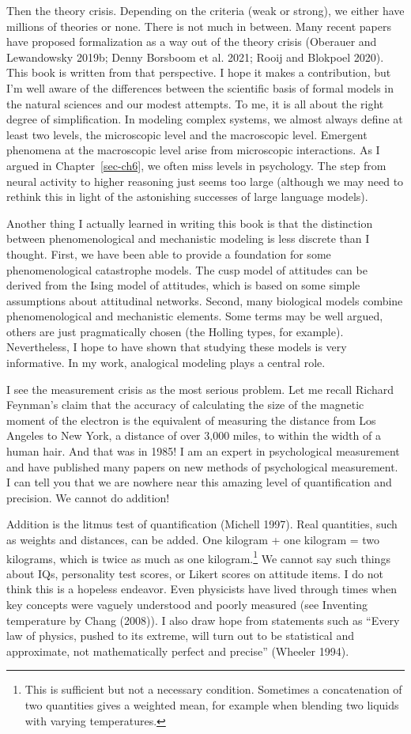 \documentclass[
  a4paper,
  DIV=11,
  numbers=noendperiod]{scrreprt}
\begin{document}
Then the theory crisis. Depending on the criteria (weak or strong), we
either have millions of theories or none. There is not much in between.
Many recent papers have proposed formalization as a way out of the
theory crisis (Oberauer and Lewandowsky 2019b; Denny Borsboom et al.
2021; Rooij and Blokpoel 2020). This book is written from that
perspective. I hope it makes a contribution, but I'm well aware of the
differences between the scientific basis of formal models in the natural
sciences and our modest attempts. To me, it is all about the right
degree of simplification. In modeling complex systems, we almost always
define at least two levels, the microscopic level and the macroscopic
level. Emergent phenomena at the macroscopic level arise from
microscopic interactions. As I argued in Chapter~\ref{sec-ch6}, we often
miss levels in psychology. The step from neural activity to higher
reasoning just seems too large (although we may need to rethink this in
light of the astonishing successes of large language models).

Another thing I actually learned in writing this book is that the
distinction between phenomenological and mechanistic modeling is less
discrete than I thought. First, we have been able to provide a
foundation for some phenomenological catastrophe models. The cusp model
of attitudes can be derived from the Ising model of attitudes, which is
based on some simple assumptions about attitudinal networks. Second,
many biological models combine phenomenological and mechanistic
elements. Some terms may be well argued, others are just pragmatically
chosen (the Holling types, for example). Nevertheless, I hope to have
shown that studying these models is very informative. In my work,
analogical modeling plays a central role.

I see the measurement crisis as the most serious problem. Let me recall
Richard Feynman's claim that the accuracy of calculating the size of the
magnetic moment of the electron is the equivalent of measuring the
distance from Los Angeles to New York, a distance of over 3,000 miles,
to within the width of a human hair. And that was in 1985! I am an
expert in psychological measurement and have published many papers on
new methods of psychological measurement. I can tell you that we are
nowhere near this amazing level of quantification and precision. We
cannot do addition!

Addition is the litmus test of quantification (Michell 1997). Real
quantities, such as weights and distances, can be added. One kilogram +
one kilogram = two kilograms, which is twice as much as one
kilogram.\footnote{This is sufficient but not a necessary condition.
  Sometimes a concatenation of two quantities gives a weighted mean, for
  example when blending two liquids with varying temperatures.} We
cannot say such things about IQs, personality test scores, or Likert
scores on attitude items. I do not think this is a hopeless endeavor.
Even physicists have lived through times when key concepts were vaguely
understood and poorly measured (see Inventing temperature by Chang
(2008)). I also draw hope from statements such as ``Every law of
physics, pushed to its extreme, will turn out to be statistical and
approximate, not mathematically perfect and precise'' (Wheeler 1994).
\end{document}
